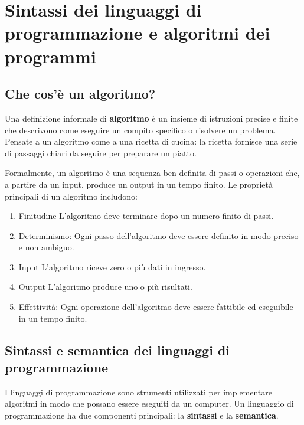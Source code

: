 \documentclass[
  letterpaper,
  DIV=11,
  numbers=noendperiod]{scrreprt}
\providecommand{\tightlist}{%
  \setlength{\itemsep}{0pt}\setlength{\parskip}{0pt}}\usepackage{longtable,booktabs,array}
\begin{document}
\chapter{Sintassi dei linguaggi di programmazione e algoritmi dei
programmi}\label{sintassi-dei-linguaggi-di-programmazione-e-algoritmi-dei-programmi}

\section{Che cos'è un algoritmo?}\label{che-cosuxe8-un-algoritmo}

Una definizione informale di \textbf{algoritmo} è un insieme di
istruzioni precise e finite che descrivono come eseguire un compito
specifico o risolvere un problema. Pensate a un algoritmo come a una
ricetta di cucina: la ricetta fornisce una serie di passaggi chiari da
seguire per preparare un piatto.

Formalmente, un algoritmo è una sequenza ben definita di passi o
operazioni che, a partire da un input, produce un output in un tempo
finito. Le proprietà principali di un algoritmo includono:

\begin{enumerate}
\def\labelenumi{\arabic{enumi}.}
\tightlist
\item
  Finitudine L'algoritmo deve terminare dopo un numero finito di passi.
\item
  Determinismo: Ogni passo dell'algoritmo deve essere definito in modo
  preciso e non ambiguo.
\item
  Input L'algoritmo riceve zero o più dati in ingresso.
\item
  Output L'algoritmo produce uno o più risultati.
\item
  Effettività: Ogni operazione dell'algoritmo deve essere fattibile ed
  eseguibile in un tempo finito.
\end{enumerate}

\section{Sintassi e semantica dei linguaggi di
programmazione}\label{sintassi-e-semantica-dei-linguaggi-di-programmazione}

I linguaggi di programmazione sono strumenti utilizzati per implementare
algoritmi in modo che possano essere eseguiti da un computer. Un
linguaggio di programmazione ha due componenti principali: la
\textbf{sintassi} e la \textbf{semantica}.
\end{document}

